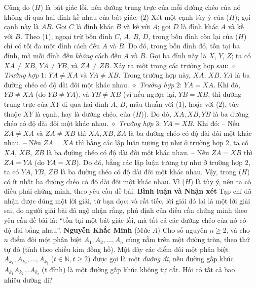 \begin{multicols}{2}
	\vskip 0.05cm
	Cũng do ($H$) là bát giác lồi, nên đường trung trực của mỗi đường chéo của nó không đi qua hai đỉnh kề nhau của bát giác.                 \hfill ($2$)
	\vskip 0.05cm
	Xét một cạnh tùy ý của ($H$); gọi cạnh này là $AB$. Gọi $C$ là đỉnh khác $B$ và kề với $A$; gọi $D$ là đỉnh khác $A$ và kề với $B$.
	\vskip 0.05cm
	Theo ($1$), ngoại trừ bốn đỉnh $C$, $A$, $B$, $D$, trong bốn đỉnh còn lại của ($H$) chỉ có tối đa một đỉnh cách đều $A$ và $B$. Do đó, trong bốn đỉnh đó, tồn tại ba đỉnh, mà mỗi đỉnh đều \textit{không} cách đều $A$ và $B$. Gọi ba đỉnh này là $X$, $Y$, $Z$; ta có $XA \ne XB$, $YA \ne YB$, và $ZA \ne ZB$. Xảy ra một trong các trường hợp sau:
	\vskip 0.05cm
	$\diamond$ \textit{Trường hợp} $1$: $YA \ne XA$ và $YA \ne XB$.
	\vskip 0.05cm
	Trong trường hợp này, $XA$, $XB$, $YA$ là ba đường chéo có độ dài đôi một khác nhau.
	\vskip 0.05cm
	$\diamond$ \textit{Trường hợp} $2$: $YA = XA$.
	\vskip 0.05cm
	Khi đó, $YB \ne XA$ (do $YB \ne YA$), và \linebreak$YB \ne XB$ (vì nếu ngược lại, $YB = XB$, thì đường trung trực của $XY$ đi qua hai đỉnh $A$, $B$, mâu thuẫn với ($1$), hoặc với ($2$), tùy thuộc $XY$ là cạnh, hay là đường chéo, của ($H$)). Do đó, $XA, XB, YB$ là ba đường chéo có độ dài đôi một khác nhau.
	\vskip 0.05cm
	$\diamond$ \textit{Trường hợp} $3$: $YA = XB$.
	\vskip 0.05cm
	Khi đó:
	\vskip 0.05cm
	-- Nếu $ZA \ne XA$ và $ZA \ne XB$ thì $XA, XB, ZA$ là ba đường chéo có độ dài đôi một khác nhau.
	\vskip 0.05cm
	-- Nếu $ZA = XA$ thì bằng các lập luận tương tự như ở trường hợp $2$, ta có $XA$, $XB$, $ZB$ là ba đường chéo có độ dài đôi một khác nhau.
	\vskip 0.05cm
	-- Nếu $ZA = XB$ thì $ZA = YA$ (do $YA = XB$). Do đó, bằng các lập luận tương tự như ở trường hợp $2$, ta có $YA$, $YB$, $ZB$ là ba đường chéo có độ dài đôi một khác nhau.
	\vskip 0.05cm
	Vậy, trong ($H$) có ít nhất ba đường chéo có độ dài đôi một khác nhau.
	\vskip 0.05cm
	Vì ($H$) là tùy ý, nên ta có điều phải chứng minh, theo yêu cầu đề bài.
	\vskip 0.05cm
	\textbf{\color{thachthuctoanhoc}Bình luận và Nhận xét}
	\vskip 0.05cm
	Tạp chí đã nhận được đúng một lời giải, từ bạn đọc; và rất tiếc, lời giải đó lại là một lời giải sai, do người giải bài đã ngộ nhận rằng, phủ định của điều cần chứng minh theo yêu cầu đề bài là: “tồn tại một bát giác lồi, mà tất cả các đường chéo của nó có độ dài bằng nhau”.
	\vskip 0.2cm
	\hfill\textbf{\color{thachthuctoanhoc}Nguyễn Khắc Minh}
	\vskip 0.2cm
	{}
	(Mức $A$) Cho số nguyên $n \ge 2$, và cho $n$ điểm đôi một phân biệt  $A_1, A_2, \ldots, A_n$   cùng nằm trên một đường tròn, theo thứ tự đó (tính theo chiều kim đồng hồ). Một dãy các điểm đôi một phân biệt  $A_{k_1}, A_{k_2}, \ldots, A_{k_t}$ ($t \in \mathbb{N}, t \ge 2$) được gọi là một \textit{đường đi}, nếu đường gấp khúc $A_{k_1}A_{k_2}\ldots A_{k_t}$ ($t$ đỉnh) là một đường gấp khúc không tự cắt. Hỏi có tất cả bao nhiêu đường đi?

\end{multicols}
